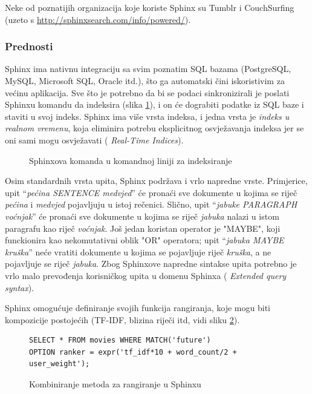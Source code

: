 \documentclass[a4paper,twoside,12pt]{scrreprt}
\begin{document}
Neke od poznatijih organizacija koje koriste Sphinx su Tumblr i CouchSurfing (uzeto s \url{http://sphinxsearch.com/info/powered/}).

\subsubsection{Prednosti}

Sphinx ima nativnu integraciju sa svim poznatim SQL bazama (PostgreSQL, MySQL, Microsoft SQL, Oracle itd.), što ga automatski čini iskoristivim za većinu aplikacija. Sve što je potrebno da bi se podaci sinkronizirali je poslati Sphinxu komandu da indeksira (slika \ref{sphinx-indexing}), i on će dograbiti podatke iz SQL baze i staviti u svoj indeks. Sphinx ima više vrsta indeksa, i jedna vrsta je \textit{indeks u realnom vremenu}, koja eliminira potrebu eksplicitnog osvježavanja indeksa jer se oni sami mogu osvježavati (\cite{sphinx} \textit{Real-Time Indices}).

\begin{figure}[H]
  \centering
  \caption{Sphinxova komanda u komandnoj liniji za indeksiranje}
  \label{sphinx-indexing}
\end{figure}

Osim standardnih vrsta upita, Sphinx podržava i vrlo napredne vrste. Primjerice, upit ``\textit{pećina SENTENCE medvjed}'' će pronaći sve dokumente u kojima se riječ \textit{pećina} i \textit{medvjed} pojavljuju u istoj rečenici. Slično, upit ``\textit{jabuke PARAGRAPH voćnjak}'' će pronaći sve dokumente u kojima se riječ \textit{jabuka} nalazi u istom paragrafu kao riječ \textit{voćnjak}. Još jedan koristan operator je "MAYBE", koji funckionira kao nekomutativni oblik "OR" operatora; upit ``\textit{jabuka MAYBE kruška}'' neće vratiti dokumente u kojima se pojavljuje riječ \textit{kruška}, a ne pojavljuje se riječ \textit{jabuka}. Zbog Sphinxove napredne sintakse upita potrebno je vrlo malo prevođenja korisničkog upita u domenu Sphinxa (\cite{sphinx} \textit{Extended query syntax}).

Sphinx omogućuje definiranje svojih funkcija rangiranja, koje mogu biti kompozicije postojećih (TF-IDF, blizina riječi itd, vidi sliku \ref{sphinx-ranking}).

\begin{figure}[H]
  \begin{Verbatim}[frame=single]
SELECT * FROM movies WHERE MATCH('future')
OPTION ranker = expr('tf_idf*10 + word_count/2 + user_weight');
  \end{Verbatim}
  \caption{Kombiniranje metoda za rangiranje u Sphinxu}
  \label{sphinx-ranking}
\end{figure}
\end{document}
